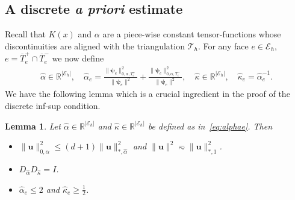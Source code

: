 \documentclass[11pt]{amsart}
\numberwithin{equation}{section}
\newtheorem{lemma}{Lemma}[section]
\theoremstyle{definition}\newtheorem{example}{Example}[section]
\begin{document}
\subsection{A discrete \emph{a priori} estimate}
Recall that $K(x)$ and $\alpha$ are a piece-wise constant
tensor-functions whose discontinuities are aligned with the
triangulation $\mathcal{T}_h$. For any face $e\in \mathcal{E}_h$, 
$e=\overline T_e^+\cap \overline T_e^{-}$ we
now define
\begin{equation}\label{eq:alphae}
\begin{aligned}
\widehat{\alpha}\in \mathbb{R}^{|\mathcal{E}_h|}, \quad 
\widehat{\alpha}_e =  
\frac{\| {{\boldsymbol \psi}}_e\|^2_{0,\alpha,T_e^+}}{\| {{\boldsymbol \psi}}_e\|^2}+
\frac{\|{{\boldsymbol \psi}}_e\|^2_{0,\alpha,T_e^-}}{\| {{\boldsymbol \psi}}_e\|^2},
\quad \widehat{\kappa}\in \mathbb{R}^{|\mathcal{E}_h|}, 
\quad \widehat{\kappa}_e = \widehat{\alpha}_e^{-1}.
\end{aligned}
\end{equation}
We have the following lemma which is a crucial ingredient in the proof
of the discrete inf-sup condition. 
\begin{lemma}\label{lemma:mass-equivalence} 
Let $\widehat{\alpha}\in\mathbb{R}^{|\mathcal{E}_h|}$ and
$\widehat{\kappa}\in\mathbb{R}^{|\mathcal{E}_h|}$ be defined as
in~\eqref{eq:alphae}. Then
\begin{itemize}
\item[(i)]  
$\|{{\mathbf u}}\|^2_{0,\alpha} \le
  (d+1)\|{{\mathbf u}}\|^2_{*,\widehat{\alpha}}$ and 
$\|{{\mathbf u}}\|^2 \eqsim \|{{\mathbf u}}\|^2_{*,1}$.
\item[(ii)] $D_{\widehat{\alpha}}D_{\widehat{\kappa}} = I$.
\item[(iii)] $\widehat{\alpha}_e\le 2$ and  
$\widehat{\kappa}_e\ge \frac12$.  
\end{itemize}
\end{lemma}
\end{document}
